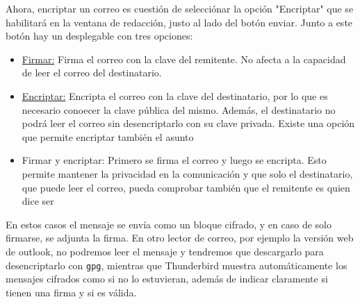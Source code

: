Ahora, encriptar un correo es cuestión de selecciónar la opción "Encriptar" que se habilitará en la ventana de redacción, justo al lado del botón enviar. Junto a este botón hay un desplegable con tres opciones:
\begin{itemize}
    \item{\underline{Firmar:} Firma el correo con la clave del remitente. No afecta a la capacidad de leer el correo del destinatario.}
    \item{\underline{Encriptar:} Encripta el correo con la clave del destinatario, por lo que es necesario conoecer la clave pública del mismo. Además, el destinatario no podrá leer el correo sin desencriptarlo con su clave privada. Existe una opción que permite encriptar también el asunto}
    \item{Firmar y encriptar: Primero se firma el correo y luego se encripta. Esto permite mantener la privacidad en la comunicación y que solo el destinatario, que puede leer el correo, pueda comprobar también que el remitente es quien dice ser}
\end{itemize}

En estos casos el mensaje se envía como un bloque cifrado, y en caso de solo firmarse, se adjunta la firma. En otro lector de correo, por ejemplo la versión web de outlook, no podremos leer el mensaje y tendremos que descargarlo para desencriptarlo con \texttt{gpg}, mientras que Thunderbird muestra automáticamente los mensajes cifrados como si no lo estuvieran, además de indicar claramente si tienen una firma y si es válida.